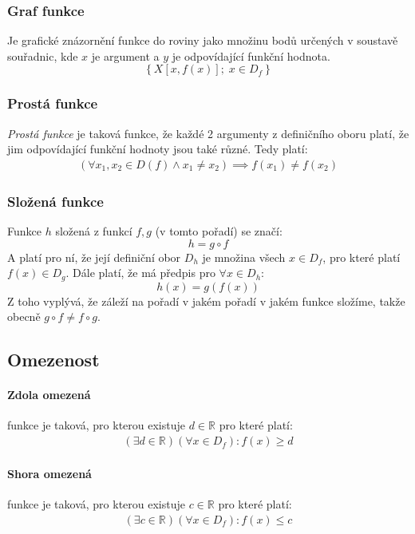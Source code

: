 \documentclass[12pt]{article}
\newcommand{\nR}{\mathbb{R}} %
\begin{document}
\subsubsection{Graf funkce}
Je grafické znázornění funkce do roviny jako množinu bodů určených v soustavě souřadnic, kde $x$ je argument a $y$ je odpovídající funkční hodnota.
\begin{equation}
\left\{ X\left[x, f(x)\right]; \; x \in D_f \right\}
\end{equation}
\subsubsection{Prostá funkce}
\emph{Prostá funkce} je taková funkce, že každé 2 argumenty z definičního oboru platí, že jim odpovídající funkční hodnoty jsou také různé. Tedy platí:
\begin{align}
(\forall x_1,x_2 \in D(f) \land x_1 \neq  x_2) \implies f(x_1) \neq f(x_2)
\end{align}
\subsubsection{Složená funkce}
Funkce $h$ složená z funkcí $f,g$ (v tomto pořadí) se značí:
\begin{equation}
h = g \circ f
\end{equation}
A platí pro ní, že její definiční obor $D_h$ je množina všech $x \in D_f$, pro které platí $f(x) \in D_g$. Dále platí, že má předpis pro $\forall x \in D_h$:
\begin{equation}
h(x) = g(f(x))
\end{equation}
Z toho vyplývá, že záleží na pořadí v jakém pořadí v jakém funkce složíme, takže obecně $ g \circ f \neq f \circ g$.
\subsection{Omezenost}
\paragraph{Zdola omezená} funkce je taková, pro kterou existuje $d \in \nR$ pro které platí:
\begin{align}
( \exists d \in \nR)( \forall x \in D_f): f(x) \geq d
\end{align}
\paragraph{Shora omezená} funkce je taková, pro kterou existuje $c \in \nR$ pro které platí:
\begin{align}
( \exists c \in \nR)( \forall x \in D_f): f(x) \leq c
\end{align} 
\end{document}
